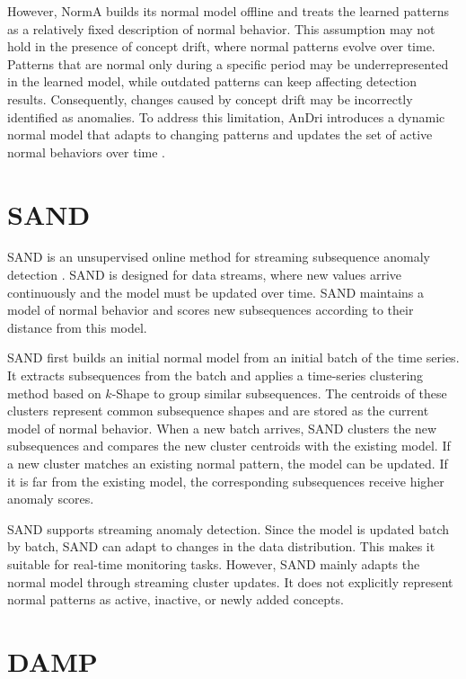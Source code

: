 However, NormA builds its normal model offline and treats the learned patterns as a relatively fixed description of normal behavior. This assumption may not hold in the presence of concept drift, where normal patterns evolve over time. Patterns that are normal only during a specific period may be underrepresented in the learned model, while outdated patterns can keep affecting detection results. Consequently, changes caused by concept drift may be incorrectly identified as anomalies. To address this limitation, AnDri introduces a dynamic normal model that adapts to changing patterns and updates the set of active normal behaviors over time \citep{park2025adaptive}.


\section{SAND}

SAND is an unsupervised online method for streaming subsequence anomaly detection \citep{boniol2021sand}. SAND is designed for data streams, where new values arrive continuously and the model must be updated over time. SAND maintains a model of normal behavior and scores new subsequences according to their distance from this model.

SAND first builds an initial normal model from an initial batch of the time series. It extracts subsequences from the batch and applies a time-series clustering method based on \(k\)-Shape to group similar subsequences. The centroids of these clusters represent common subsequence shapes and are stored as the current model of normal behavior. When a new batch arrives, SAND clusters the new subsequences and compares the new cluster centroids with the existing model. If a new cluster matches an existing normal pattern, the model can be updated. If it is far from the existing model, the corresponding subsequences receive higher anomaly scores.

SAND supports streaming anomaly detection. Since the model is updated batch by batch, SAND can adapt to changes in the data distribution. This makes it suitable for real-time monitoring tasks. However, SAND mainly adapts the normal model through streaming cluster updates. It does not explicitly represent normal patterns as active, inactive, or newly added concepts.

\section{DAMP}

